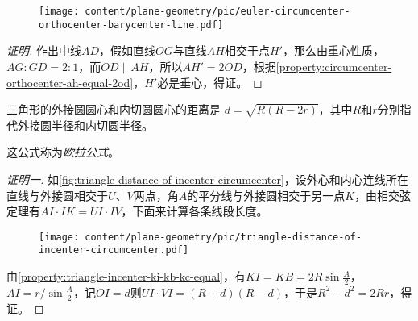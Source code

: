 \begin{figure}[htbp]
\centering
\texttt{[image: content/plane-geometry/pic/euler-circumcenter-orthocenter-barycenter-line.pdf]}
\caption{}
\label{fig:euler-circumcenter-orthocenter-barycenter-line}
\end{figure}

\begin{proof}[证明]
  作出中线$AD$，假如直线$OG$与直线$AH$相交于点$H'$，那么由重心性质，$AG:GD=2:1$，而$OD \parallel AH$，所以$AH'=2OD$，根据\autoref{property:circumcenter-orthocenter-ah-equal-2od}，$H'$必是垂心，得证。
\end{proof}

\begin{theorem}
  三角形的外接圆圆心和内切圆圆心的距离是 $d=\sqrt{R(R-2r)}$，其中$R$和$r$分别指代外接圆半径和内切圆半径。
\end{theorem}

这公式称为\emph{欧拉公式}。

\begin{proof}[证明一]
  如\autoref{fig:triangle-distance-of-incenter-circumcenter}，设外心和内心连线所在直线与外接圆相交于$U$、$V$两点，角$A$的平分线与外接圆相交于另一点$K$，由相交弦定理有$AI \cdot IK = UI \cdot IV$，下面来计算各条线段长度。
 
\begin{figure}[htbp]
\centering
\texttt{[image: content/plane-geometry/pic/triangle-distance-of-incenter-circumcenter.pdf]}
\caption{}
\label{fig:triangle-distance-of-incenter-circumcenter}
\end{figure}

由\autoref{property:triangle-incenter-ki-kb-kc-equal}，有$KI=KB=2R\sin{\frac{A}{2}}$，$AI=r/ \sin{\frac{A}{2}}$，记$OI=d$则$UI\cdot VI=(R+d)(R-d)$，于是$R^2-d^2=2Rr$，得证。
\end{proof}


